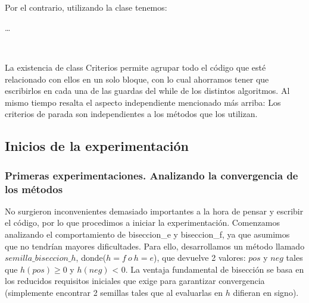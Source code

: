 ~


~

Por el contrario, utilizando la clase tenemos:

\begin{algorithmic}
	\While{$!criterios.parar(parameters)$}
		\State \ldots
	\EndWhile
\end{algorithmic}

~

La existencia de class Criterios permite agrupar todo el código que esté relacionado con ellos en un solo bloque, con lo cual ahorramos tener que escribirlos
en cada una de las guardas del while de los distintos algoritmos. Al mismo tiempo resalta el aspecto independiente mencionado más arriba: Los criterios de parada son 
independientes a los métodos que los utilizan.


\subsection{Inicios de la experimentación}

\subsubsection{Primeras experimentaciones. Analizando la convergencia de los métodos}

No surgieron inconvenientes demasiado importantes a la hora de pensar y escribir el código, por lo que procedimos a iniciar la experimentación.
Comenzamos analizando el comportamiento de biseccion\_e y biseccion\_f, ya que asumimos que no tendrían mayores dificultades. Para ello, desarrollamos un método llamado
$semilla\_biseccion\_h$, donde($h = f \ o \ h=e$), que devuelve 2 valores: $pos$ y $neg$ tales que $h(pos)$ y $h(neg)$ < 0. La ventaja fundamental de bisección
se basa en los reducidos requisitos iniciales que exige para garantizar convergencia (simplemente encontrar 2 semillas tales que al evaluarlas en $h$ difieran en signo).


